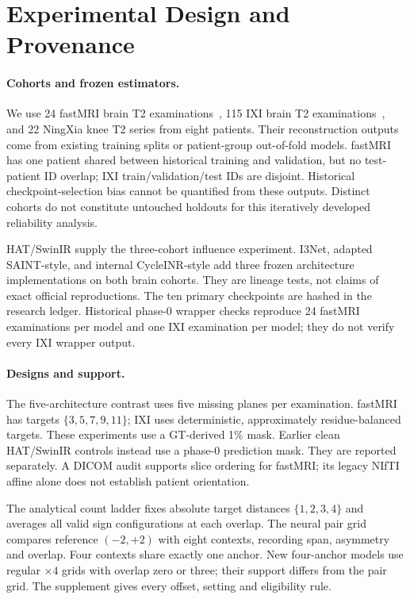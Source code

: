\documentclass[10pt,twocolumn,letterpaper]{article}
\begin{document}
\section{Experimental Design and Provenance}
\paragraph{Cohorts and frozen estimators.}
We use 24 fastMRI brain T2 examinations~\cite{knoll2020fastmri}, 115 IXI brain T2 examinations~\cite{ixi_dataset}, and 22 NingXia knee T2 series from eight patients. Their reconstruction outputs come from existing training splits or patient-group out-of-fold models. fastMRI has one patient shared between historical training and validation, but no test-patient ID overlap; IXI train/validation/test IDs are disjoint. Historical checkpoint-selection bias cannot be quantified from these outputs. Distinct cohorts do not constitute untouched holdouts for this iteratively developed reliability analysis.

HAT/SwinIR supply the three-cohort influence experiment. I3Net, adapted SAINT-style, and internal CycleINR-style add three frozen architecture implementations on both brain cohorts. They are lineage tests, not claims of exact official reproductions. The ten primary checkpoints are hashed in the research ledger. Historical phase-0 wrapper checks reproduce 24 fastMRI examinations per model and one IXI examination per model; they do not verify every IXI wrapper output.

\paragraph{Designs and support.}
The five-architecture contrast uses five missing planes per examination. fastMRI has targets $\{3,5,7,9,11\}$; IXI uses deterministic, approximately residue-balanced targets. These experiments use a GT-derived 1\% mask. Earlier clean HAT/SwinIR controls instead use a phase-0 prediction mask. They are reported separately. A DICOM audit supports slice ordering for fastMRI; its legacy NIfTI affine alone does not establish patient orientation.

The analytical count ladder fixes absolute target distances $\{1,2,3,4\}$ and averages all valid sign configurations at each overlap. The neural pair grid compares reference $(-2,+2)$ with eight contexts, recording span, asymmetry and overlap. Four contexts share exactly one anchor. New four-anchor models use regular $\times4$ grids with overlap zero or three; their support differs from the pair grid. The supplement gives every offset, setting and eligibility rule.
\end{document}
